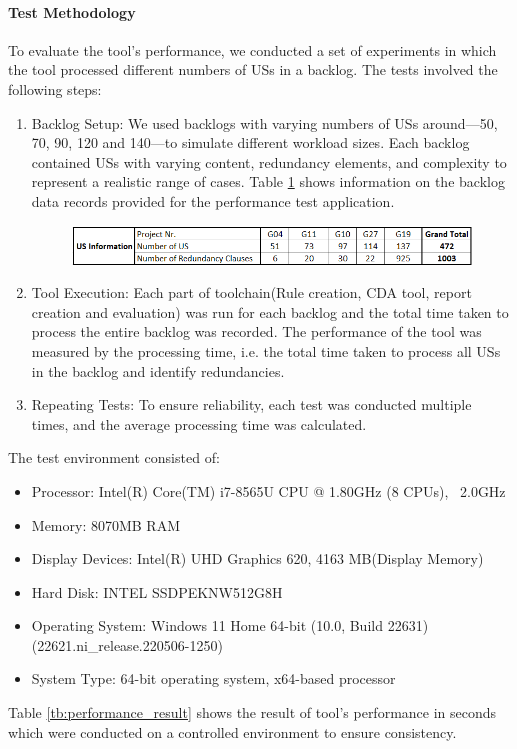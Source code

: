 \paragraph{Test Methodology}To evaluate the tool's performance, we conducted a set of experiments in which the tool processed different numbers of USs in a backlog. The tests involved the following steps:
\begin{enumerate}
	\item Backlog Setup: We used backlogs with varying numbers of USs around—50, 70, 90, 120 and 140—to simulate different workload sizes. Each backlog contained USs with varying content, redundancy elements, and complexity to represent a realistic range of cases. Table \ref{tb:performance_env} shows information on the backlog data records provided for the performance test application.
	\begin{figure}[h]
		\begingroup
		\scriptsize
		\centering
		\includegraphics[scale=0.7]{Table/performance_env.png}
		\label{tb:performance_env}
		\endgroup
	\end{figure}
	\item Tool Execution: Each part of toolchain(Rule creation, CDA tool, report creation and evaluation) was run for each backlog and the total time taken to process the entire backlog was recorded. The performance of the tool was measured by the processing time, i.e. the total time taken to process all USs in the backlog and identify redundancies.
	
	\item Repeating Tests: To ensure reliability, each test was conducted multiple times, and the average processing time was calculated.
\end{enumerate}
The test environment consisted of:
\begin{itemize}
	\item Processor: Intel(R) Core(TM) i7-8565U CPU @ 1.80GHz (8 CPUs), ~2.0GHz		
	\item Memory: 8070MB RAM
	\item Display Devices: Intel(R) UHD Graphics 620, 4163 MB(Display Memory)
	\item Hard Disk: INTEL SSDPEKNW512G8H
	\item Operating System: Windows 11 Home 64-bit (10.0, Build 22631) (22621.ni\_release.220506-1250)
	\item System Type: 64-bit operating system, x64-based processor
\end{itemize}
Table \ref{tb:performance_result} shows the result of tool's performance in seconds which were conducted on a controlled environment to ensure consistency.

